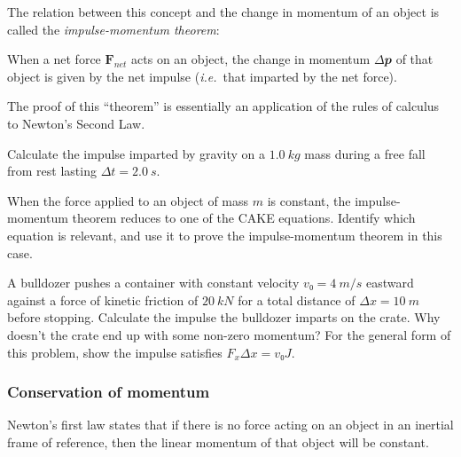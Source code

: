 The relation between this concept and the change in momentum of an object is called the {\em impulse-momentum theorem}:
\begin{theorem}
When a net force $𝐅_{net}$ acts on an object, the change in momentum $Δ𝒑$ of that object is given by the net impulse ({\it i.e.}\ that imparted by the net force).
\end{theorem}
The proof of this “theorem” is essentially an application of the rules of calculus to Newton's Second Law. 
\begin{exercise}
Calculate the impulse imparted by gravity on a $1.0 \ kg$ mass during a free fall from rest lasting $Δt = 2.0\ s$. 
\end{exercise}
\begin{exercise}
\label{X:IMT}
When the force applied to an object of mass $m$ is constant, the impulse-momentum theorem reduces to one of the CAKE equations. Identify which equation is relevant, and use it to prove the impulse-momentum theorem in this case.
\end{exercise}
\begin{exercise}
A bulldozer pushes a container with constant velocity $v₀ = 4\ m/s$ eastward against a force of kinetic friction of $20\ kN$ for a total distance of $Δx = 10\ m$ before stopping. Calculate the impulse the bulldozer imparts on the crate. Why doesn't the crate end up with some non-zero momentum? For the general form of this problem, show the impulse satisfies $F_x Δx = v₀ J$.
\end{exercise}


\subsubsection{Conservation of momentum}
Newton's first law states that if there is no force acting on an object in an inertial frame of reference, then the linear momentum of that object will be constant. 

